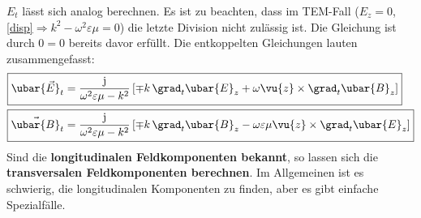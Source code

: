 	 $E_t$ lässt sich analog berechnen. Es ist zu beachten, dass im TEM-Fall ($E_z=0$, \ref{disp}$\Rightarrow k^2-\omega^2\varepsilon\mu=0$) die letzte Division nicht zulässig ist. Die Gleichung ist durch $0=0$ bereits davor erfüllt. Die entkoppelten Gleichungen lauten zusammengefasst:
	\begin{equation}\label{entkoppelgl}\begin{split}
			\Aboxed{\ubar{\vec{E}}_t &= \frac{\mathrm{j}}{\omega^2\varepsilon\mu -  k^2} \left[ \mp  k\, \grad _t \ubar{E}_{z} + \omega  \vu{z}\times\grad _t \ubar{B}_{z}\right]}\\
			\Aboxed{\vec{\ubar{B}}_t &= \frac{\mathrm{j}}{\omega^2\varepsilon\mu -  k^2} \left[ \mp  k\, \grad _t \ubar{B}_{z} - \omega\varepsilon\mu  \vu{z}\times\grad _t \ubar{E}_{z}\right]}
	\end{split}\end{equation}
	Sind die \textbf{longitudinalen Feldkomponenten bekannt}, so lassen sich die \textbf{transversalen Feldkomponenten berechnen}. Im Allgemeinen ist es schwierig, die longitudinalen Komponenten zu finden, aber es gibt einfache Spezialfälle. 
